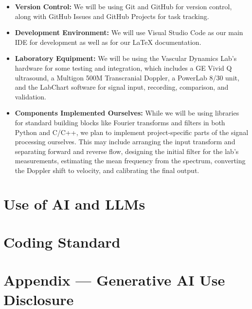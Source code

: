 \documentclass{article}
\begin{document}
\begin{itemize}
  linter and unit tests on every pull request. Since code that depends on
  physical hardware cannot run in CI, we will keep the processing logic
  separate from the hardware input and output code.
\item \textbf{Version Control:} We will be using Git and GitHub for version
  control, along with GitHub Issues and GitHub Projects for task tracking.
\item \textbf{Development Environment:} We will use Visual Studio Code as our
  main IDE for development as well as for our \LaTeX{} documentation.
\item \textbf{Laboratory Equipment:} We will be using the Vascular Dynamics
  Lab's hardware for some testing and integration, which includes a GE Vivid Q
  ultrasound, a Multigon 500M Transcranial Doppler, a PowerLab 8/30 unit, and
  the LabChart software for signal input, recording, comparison, and
  validation.
\item \textbf{Components Implemented Ourselves:} While we will be using
  libraries for standard building blocks like Fourier transforms and filters in
  both Python and C/C++, we plan to implement project-specific parts of the
  signal processing ourselves. This may include arranging the input transform
  and separating forward and reverse flow, designing the initial filter for the
  lab's measurements, estimating the mean frequency from the spectrum,
  converting the Doppler shift to velocity, and calibrating the final output.
\end{itemize}

\section{Use of AI and LLMs}


\section{Coding Standard}


\newpage{}

\section{Appendix --- Generative AI Use Disclosure}
\end{document}

